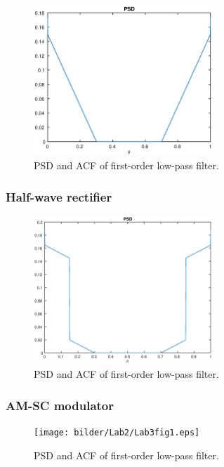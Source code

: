 \documentclass[a4paper,12pt]{article}
\begin{document}
\begin{figure}[h]
\centering
\includegraphics[width=0.6\textwidth]{bilder/Lab2/Lab2fig1.eps}
\caption{PSD and ACF of first-order low-pass filter.}
\label{fig:Lab2fig1}
\end{figure}

\subsubsection{Half-wave rectifier}

\begin{figure}[h]
\centering
\includegraphics[width=0.6\textwidth]{bilder/Lab2/Lab2fig2.eps}
\caption{PSD and ACF of first-order low-pass filter.}
\label{fig:Lab1fig1}
\end{figure}

\subsubsection{AM-SC modulator}

\begin{figure}[h]
\centering
\texttt{[image: bilder/Lab2/Lab3fig1.eps]}
\caption{PSD and ACF of first-order low-pass filter.}
\label{fig:Lab1fig1}
\end{figure}
\end{document}
